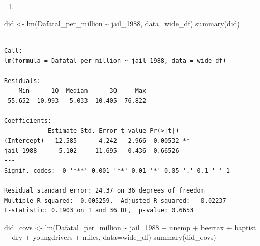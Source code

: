 \documentclass[
  letterpaper,
  DIV=11,
  numbers=noendperiod]{scrreprt}
\newenvironment{Shaded}{\begin{snugshade}}{\end{snugshade}}
\newcommand{\AttributeTok}[1]{\textcolor[rgb]{0.40,0.45,0.13}{#1}}
\newcommand{\CommentTok}[1]{\textcolor[rgb]{0.37,0.37,0.37}{#1}}
\newcommand{\DecValTok}[1]{\textcolor[rgb]{0.68,0.00,0.00}{#1}}
\newcommand{\FunctionTok}[1]{\textcolor[rgb]{0.28,0.35,0.67}{#1}}
\newcommand{\NormalTok}[1]{\textcolor[rgb]{0.00,0.23,0.31}{#1}}
\newcommand{\OtherTok}[1]{\textcolor[rgb]{0.00,0.23,0.31}{#1}}
\newcommand{\SpecialCharTok}[1]{\textcolor[rgb]{0.37,0.37,0.37}{#1}}
\providecommand{\tightlist}{%
  \setlength{\itemsep}{0pt}\setlength{\parskip}{0pt}}\usepackage{longtable,booktabs,array}
\begin{document}
\begin{Shaded}
\end{Shaded}

\begin{enumerate}
\def\labelenumi{\arabic{enumi}.}
\setcounter{enumi}{7}
\tightlist
\item
\end{enumerate}

\begin{Shaded}
\begin{Highlighting}[]
\NormalTok{did }\OtherTok{\textless{}{-}} \FunctionTok{lm}\NormalTok{(Dafatal\_per\_million }\SpecialCharTok{\textasciitilde{}}\NormalTok{ jail\_1988, }\AttributeTok{data=}\NormalTok{wide\_df)}
\FunctionTok{summary}\NormalTok{(did)}
\end{Highlighting}
\end{Shaded}

\begin{verbatim}

Call:
lm(formula = Dafatal_per_million ~ jail_1988, data = wide_df)

Residuals:
    Min      1Q  Median      3Q     Max 
-55.652 -10.993   5.033  10.405  76.822 

Coefficients:
            Estimate Std. Error t value Pr(>|t|)   
(Intercept)  -12.585      4.242  -2.966  0.00532 **
jail_1988      5.102     11.695   0.436  0.66526   
---
Signif. codes:  0 '***' 0.001 '**' 0.01 '*' 0.05 '.' 0.1 ' ' 1

Residual standard error: 24.37 on 36 degrees of freedom
Multiple R-squared:  0.005259,  Adjusted R-squared:  -0.02237 
F-statistic: 0.1903 on 1 and 36 DF,  p-value: 0.6653
\end{verbatim}

\begin{Shaded}
\begin{Highlighting}[]
\NormalTok{did\_covs }\OtherTok{\textless{}{-}} \FunctionTok{lm}\NormalTok{(Dafatal\_per\_million }\SpecialCharTok{\textasciitilde{}}\NormalTok{ jail\_1988 }\SpecialCharTok{+}\NormalTok{ unemp }\SpecialCharTok{+}\NormalTok{ beertax }\SpecialCharTok{+}\NormalTok{ baptist }\SpecialCharTok{+}\NormalTok{ dry }\SpecialCharTok{+}\NormalTok{ youngdrivers }\SpecialCharTok{+}\NormalTok{ miles, }\AttributeTok{data=}\NormalTok{wide\_df)}
\FunctionTok{summary}\NormalTok{(did\_covs)}
\end{Highlighting}
\end{Shaded}
\end{document}
